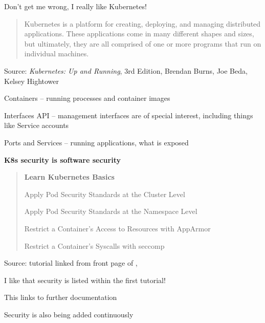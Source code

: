 \documentclass[Screen16to9,17pt]{foils}
\begin{document}
Don't get me wrong, I really like Kubernetes!



\begin{quote}
Kubernetes is a platform for creating, deploying, and managing distributed applications. These applications come in many different shapes and sizes, but ultimately, they are all comprised of one or more programs that run on individual machines.
\end{quote}
Source: \emph{Kubernetes: Up and Running}, 3rd Edition, Brendan Burns, Joe Beda, Kelsey Hightower

\begin{list2}
\item Containers -- running processes and container images
\item Interfaces API -- management interfaces are of special interest, including things like Service accounts
\item Ports and Services -- running applications, what is exposed
\item {\bf K8s security is software security}
\end{list2}






\begin{quote}
{\bf Learn Kubernetes Basics}
\begin{list2}
\item Apply Pod Security Standards at the Cluster Level
\item Apply Pod Security Standards at the Namespace Level
\item Restrict a Container's Access to Resources with AppArmor
\item Restrict a Container's Syscalls with seccomp
\end{list2}
\end{quote}
Source: tutorial  linked from front page of ,\\

\begin{list2}
\item I like that security is listed within the first tutorial!
\item This links to further documentation
\item Security is also being added continuously
\end{list2}
\end{document}
